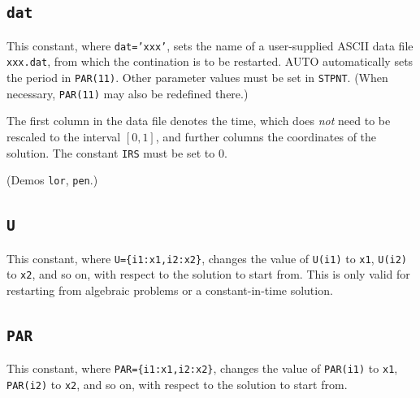 \documentclass[12pt]{report}
\begin{document}
\subsection{\texttt{dat}}  \label{sec:dat}
This constant, where {\tt dat='xxx'}, sets the name of a user-supplied ASCII
data file {\tt xxx.dat}, from which the contination is to be restarted.
{\cal AUTO} automatically sets the period in {\tt PAR(11)}.
Other parameter values must be set in {\tt STPNT}. (When necessary,
{\tt PAR(11)} may also be redefined there.) 

The first column in the data file denotes the time, which does
\emph{not} need to be rescaled to the interval $[0,1]$, and further
columns the coordinates of the solution. The constant {\tt IRS} must
be set to 0.

(Demos {\tt lor}, {\tt pen}.)

\subsection{\texttt{U}}  \label{sec:U}
This constant, where {\tt U=\{i1:x1,i2:x2\}}, changes the value of
{\tt U(i1)} to {\tt x1}, {\tt U(i2)} to {\tt x2}, and so on,
with respect to the solution to start from. This is only
valid for restarting from algebraic problems or a constant-in-time
solution.

\subsection{\texttt{PAR}}  \label{sec:PAR}
This constant, where {\tt PAR=\{i1:x1,i2:x2\}}, changes the value of
{\tt PAR(i1)}  to {\tt x1}, {\tt PAR(i2)} to
{\tt x2}, and so on, with respect to the solution to start from.
\end{document}
